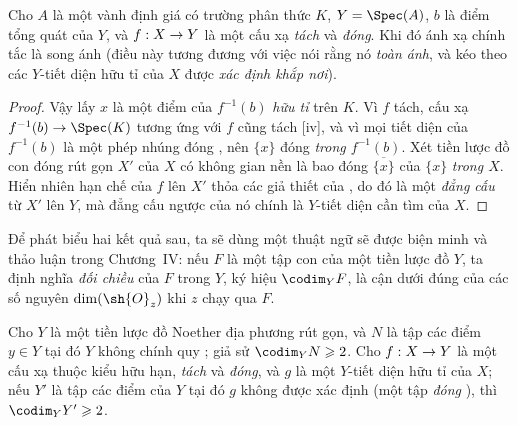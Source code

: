 \documentclass[oneside,10pt]{amsart}
\makeatletter
\renewcommand{\geq}{\geqslant}
\newcommand{\ega@arrow}[2]{\mathchoice{#1}{#2}{#2}{#2}}
\renewcommand{\to}{\ega@arrow{\longrightarrow}{\rightarrow}}
\newcommand{\oldpage}[2][]{\marginnote{\normalfont\footnotesize\textbf{#1}~|~#2}\ignorespaces}
\let\EGAOriginalLabel\label
\renewcommand{\label}[1]{\phantomsection\EGAOriginalLabel{#1}}
\makeatother
\begin{document}
\begin{proposition}[7.3.3]
\label{II.7.3.3}
Cho $A$ là một vành định giá có trường phân thức $K$, $Y=\Spec(A)$, $b$ là điểm tổng quát của $Y$, và $f:X\to Y$ là một cấu xạ \emph{tách} và \emph{đóng}.
Khi đó ánh xạ chính tắc  là song ánh (điều này tương đương với việc nói rằng nó \emph{toàn ánh}, và kéo theo các $Y$-tiết diện hữu tỉ của $X$ được \emph{xác định khắp nơi}).
\end{proposition}

\begin{proof}
Vậy lấy $x$ là một điểm của $f^{-1}(b)$ \emph{hữu tỉ} trên $K$.
Vì $f$ tách, cấu xạ $f^{-1}(b)\to\Spec(K)$ tương ứng với $f$ cũng tách [iv], và vì mọi tiết diện của $f^{-1}(b)$ là một phép nhúng đóng , nên $\{x\}$ đóng \emph{trong $f^{-1}(b)$}.
Xét tiền lược đồ con đóng rút gọn $X'$ của $X$ có không gian nền là bao đóng $\overline{\{x\}}$ của $\{x\}$ \emph{trong $X$}.
Hiển nhiên hạn chế của $f$ lên $X'$ thỏa các giả thiết của , do đó là một \emph{đẳng cấu} từ $X'$ lên $Y$, mà đẳng cấu ngược của nó chính là $Y$-tiết diện cần tìm của $X$.
\end{proof}

\begin{env}[7.3.4]
\label{II.7.3.4}
Để phát biểu hai kết quả sau, ta sẽ dùng một thuật ngữ sẽ được biện minh và thảo luận trong Chương~IV: nếu $F$ là một tập con
\oldpage[II]{144}
của một tiền lược đồ $Y$, ta định nghĩa \emph{đối chiều} của $F$ trong $Y$, ký hiệu $\codim_Y F$, là cận dưới đúng của các số nguyên $\dim(\sh{O}_z)$ khi $z$ chạy qua $F$.
\end{env}

\begin{corollary}[7.3.5]
\label{II.7.3.5}
Cho $Y$ là một tiền lược đồ Noether địa phương rút gọn, và $N$ là tập các điểm $y\in Y$ tại đó $Y$ không chính quy ;
giả sử $\codim_Y N\geq2$.
Cho $f:X\to Y$ là một cấu xạ thuộc kiểu hữu hạn, \emph{tách} và \emph{đóng}, và $g$ là một $Y$-tiết diện hữu tỉ của $X$;
nếu $Y'$ là tập các điểm của $Y$ tại đó $g$ không được xác định (một tập \emph{đóng} ), thì $\codim_Y Y'\geq2$.
\end{corollary}
\end{document}
